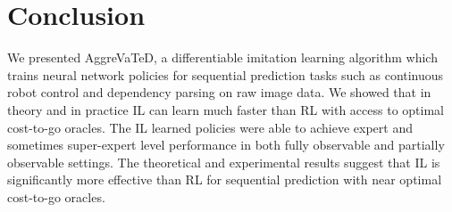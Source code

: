 \documentclass{article}
\begin{document}
\vspace{-5pt}
\section{Conclusion}
We presented AggreVaTeD, a differentiable imitation learning algorithm which trains neural network policies for sequential prediction tasks such as continuous robot control and dependency parsing on raw image data. We showed that in theory and in practice IL can learn much faster than RL with access to optimal cost-to-go oracles. The IL learned policies were able to achieve expert and sometimes super-expert level performance in both fully observable and partially observable settings. The theoretical and experimental results suggest that IL is significantly more effective than RL for sequential prediction with near optimal cost-to-go oracles.




\end{document}

